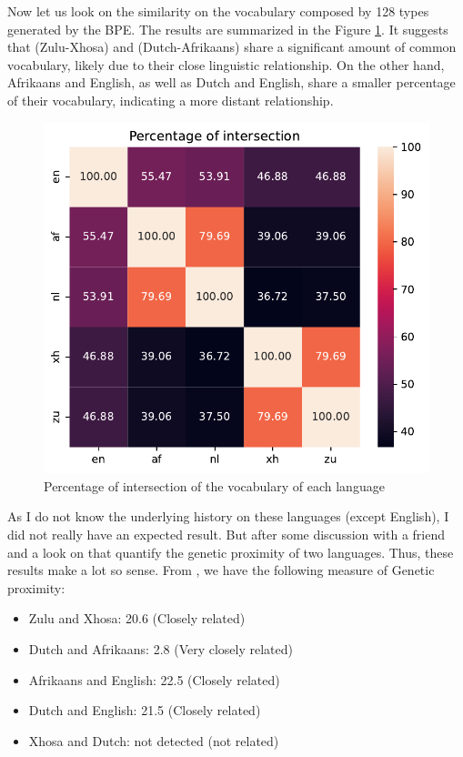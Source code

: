Now let us look on the similarity on the vocabulary composed by 128 types generated by the BPE. The results are summarized in the Figure \ref{fig:similarity}. It suggests that (Zulu-Xhosa) and (Dutch-Afrikaans) share a significant amount of common vocabulary, likely due to their close linguistic relationship. On the other hand, Afrikaans and English, as well as Dutch and English, share a smaller percentage of their vocabulary, indicating a more distant relationship.

\begin{figure}[H]
	\centering
	\includegraphics[width=0.75\linewidth]{./figures/intersection_cmf.pdf}
	\caption{Percentage of intersection of the vocabulary of each language}
	\label{fig:similarity}
\end{figure}

As I do not know the underlying history on these languages (except English), I did not really have an expected result. But after some discussion with a friend and a look on \cite{elinguisticsnet2023compare} that quantify the genetic proximity of two languages.
Thus, these results make a lot so sense. From \cite{elinguisticsnet2023compare}, we have the following measure of Genetic proximity:
\begin{itemize}
	\item Zulu and Xhosa: 20.6 (Closely related)
	\item Dutch and Afrikaans: 2.8 (Very closely related)
	\item Afrikaans and English: 22.5 (Closely related)
	\item Dutch and English: 21.5 (Closely related)
	\item Xhosa and  Dutch: not detected (not related)
\end{itemize}

